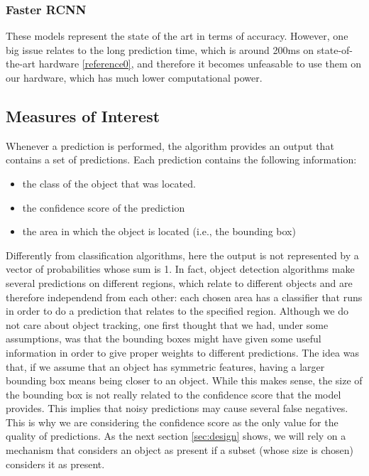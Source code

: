 \documentclass[10pt,conference,compsocconf]{IEEEtran}
\begin{document}
\subsubsection{Faster RCNN}
These models represent the state of the art in terms of accuracy. However, one big issue relates to the long prediction time, which is around 200ms on state-of-the-art hardware \ref{reference0}, and therefore it becomes unfeasable to use them on our hardware, which has much lower computational power.
\subsection{Measures of Interest}
Whenever a prediction is performed, the algorithm provides an output that contains a set of predictions. Each prediction contains the following information:
\begin{itemize}
\item the class of the object that was located.
\item the confidence score of the prediction
\item the area in which the object is located (i.e., the bounding box)
\end{itemize}
Differently from classification algorithms, here the output is not represented by a vector of probabilities whose sum is 1. In fact, object detection algorithms make several predictions on different regions, which relate to different objects and are therefore independend from each other: each chosen area has a classifier that runs in order to do a prediction that relates to the specified region.
Although we do not care about object tracking, one first thought that we had, under some assumptions, was that the bounding boxes might have given some useful information in order to give proper weights to different predictions. The idea was that, if we assume that an object has symmetric features, having a larger bounding box means being closer to an object. While this makes sense, the size of the bounding box is not really related to the confidence score that the model provides. This implies that noisy predictions may cause several false negatives. This is why we are considering the confidence score as the only value for the quality of predictions. As the next section \ref{sec:design} shows, we will rely on a mechanism that considers an object as present if a subset (whose size is chosen) considers it as present.
\end{document}
